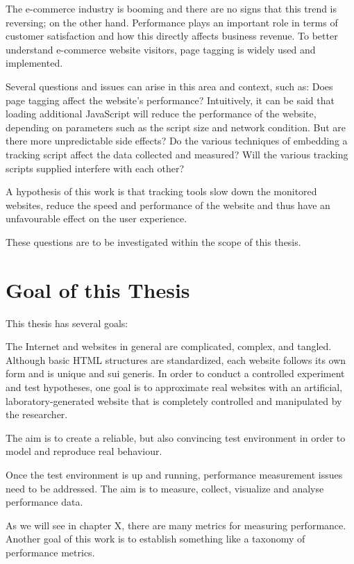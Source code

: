 The e-commerce industry is booming and there are no signs that this trend is reversing; on the other hand.
Performance plays an important role in terms of customer satisfaction and how this directly affects business revenue.
To better understand e-commerce website visitors, page tagging is widely used and implemented.

Several questions and issues can arise in this area and context, such as: Does page tagging affect the website's performance?
Intuitively, it can be said that loading additional JavaScript will reduce the performance of the website, depending on parameters such as the script size and network condition.
But are there more unpredictable side effects?
Do the various techniques of embedding a tracking script affect the data collected and measured?
Will the various tracking scripts supplied interfere with each other?

A hypothesis of this work is that tracking tools slow down the monitored websites, reduce the speed and performance of the website and thus have an unfavourable effect on the user experience.

These questions are to be investigated within the scope of this thesis.




\section{Goal of this Thesis}

This thesis has several goals:

The Internet and websites in general are complicated, complex, and tangled.
Although basic HTML structures are standardized, each website follows its own form and is unique and sui generis.
In order to conduct a controlled experiment and test hypotheses, one goal is to approximate real websites with an artificial, laboratory-generated website that is completely controlled and manipulated by the researcher.

The aim is to create a reliable, but also convincing test environment in order to model and reproduce real behaviour.

Once the test environment is up and running, performance measurement issues need to be addressed.
The aim is to measure, collect, visualize and analyse performance data.

As we will see in chapter X, there are many metrics for measuring performance.
Another goal of this work is to establish something like a taxonomy of performance metrics.





